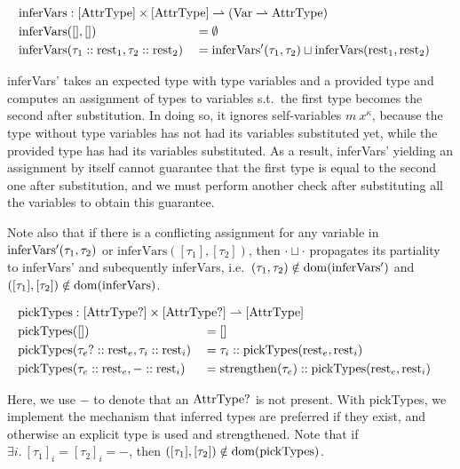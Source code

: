 \newcommand{\inferVars}{\mathrm{inferVars}}

\begin{alignat*}{3}
	\inferVars &: \mathrlap{[\AttrType] \times [\AttrType] \rightharpoonup (\Var \rightharpoonup \AttrType)} \\
	\inferVars&([], []) &&= \emptyset \\
	\inferVars&(\tau_1 :: \rest_1, \tau_2 :: \rest_2) &&= \inferVarsDash(\tau_1, \tau_2) \sqcup \inferVars(\rest_1, \rest_2) \\
\end{alignat*}

inferVars' takes an expected type with type variables and a provided type and computes an assignment of types to variables s.t.\ the first type becomes the second after substitution. In doing so, it ignores self-variables $m\ x^\kappa$, because the type without type variables has not had its variables substituted yet, while the provided type has had its variables substituted. As a result, inferVars' yielding an assignment by itself cannot guarantee that the first type is equal to the second one after substitution, and we must perform another check after substituting all the variables to obtain this guarantee. 

Note also that if there is a conflicting assignment for any variable in $\mathrm{inferVars'}(\tau_1, \tau_2)$ or $\inferVars([\tau_1], [\tau_2])$, then $\cdot \sqcup \cdot$ propagates its partiality to inferVars' and subequently inferVars, i.e.\ $(\tau_1, \tau_2) \notin \mathrm{dom}(\mathrm{inferVars'})$ and $([\tau_1], [\tau_2]) \notin \dom(\inferVars)$.

\newcommand{\pickTypes}{\mathrm{pickTypes}}

\begin{alignat*}{3}
	\pickTypes &: \mathrlap{[\AttrType?] \times [\AttrType?] \rightharpoonup [\AttrType]} \\
	\pickTypes&([]) &&= [] \\
	\pickTypes&(\tau_e? :: \rest_e, \tau_i :: \rest_i) &&= \tau_i :: \pickTypes(\rest_e, \rest_i) \\
	\pickTypes&(\tau_e :: \rest_e, - :: \rest_i) &&= \strengthen(\tau_e) :: \pickTypes(\rest_e, \rest_i) \\
\end{alignat*}

Here, we use $-$ to denote that an $\mathrm{AttrType}?$ is not present.
With pickTypes, we implement the mechanism that inferred types are preferred if they exist, and otherwise an explicit type is used and strengthened. Note that if $\exists i.\ [\tau_1]_i = [\tau_2]_i = -$, then $([\tau_1], [\tau_2]) \notin \dom(\pickTypes)$.

